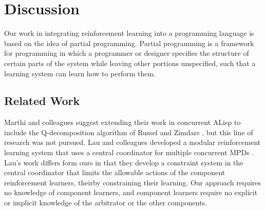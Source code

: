 \section{Discussion}

Our work in integrating reinforcement learning into a programming language is based on the idea of partial programming. Partial programming is a framework for programming in which a programmer or designer specifies the structure of certain parts of the system while leaving other portions unspecified, such that a learning system can learn how to perform them.


\subsection{Related Work}

Marthi and colleagues \cite{marthi2005concurrent} suggest extending their work in concurrent ALisp to include the Q-decomposition algorithm of Russel and Zimdars \cite{2003q-decomposition}, but this line of research was not pursued. Lau and colleagues developed a modular reinforcement learning system that uses a central coordinator for multiple concurrent MPDs \cite{lau2012coordination}. Lau's work differs form ours in that they develop a constraint system in the central coordinator that limits the allowable actions of the component reinforcement learners, theirby constraining their learning. Our approach requires no knowledge of component learners, and component learners require no explicit or implicit knowledge of the arbitrator or the other components.
